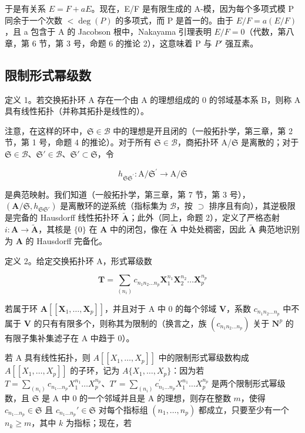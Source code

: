 于是有关系 \(E = F + aE\)。现在，E/F 是有限生成的 A-模，因为每个多项式模 P 同余于一个次数 \(<\deg(P)\) 的多项式，而 P 是首一的。由于 \(E/F = a(E/F)\)，且 a 包含于 A 的 Jacobson 根中，Nakayama 引理表明 \(E/F = 0\)（代数，第八章，第 6 节，第 3 号，命题 6 的推论 2），这意味着 P 与 \(P'\) 强互素。

\subsection{限制形式幂级数}

定义 1。若交换拓扑环 A 存在一个由 A 的理想组成的 0 的邻域基本系 B，则称 A 具有线性拓扑（并称其拓扑是线性的）。

注意，在这样的环中，\(\mathfrak{S} \in \mathcal{B}\) 中的理想是开且闭的（一般拓扑学，第三章，第 2 节，第 1 号，命题 4 的推论）。对于所有 \(\mathfrak{S} \in \mathcal{B}\)，商拓扑环 A/\(\mathfrak{S}\) 是离散的；对于 \(\mathfrak{S} \in \mathcal{B}\)、\(\mathfrak{S}' \in \mathcal{B}\)、\(\mathfrak{S}' \subset \mathfrak{S}\)，令

\[
h _ {\mathfrak {S S} ^ {\prime}} \colon \mathrm{A} / \mathfrak {S} ^ {\prime} \rightarrow \mathrm{A} / \mathfrak {S}
\]

是典范映射。我们知道（一般拓扑学，第三章，第 7 节，第 3 号），\((\mathbf{A} / \mathfrak{S}, h_{\mathfrak{S}\mathfrak{S}'})\) 是离散环的逆系统（指标集为 \(\mathcal{B}\)，按 \(\supset\) 排序且有向），其逆极限是完备的 Hausdorff 线性拓扑环 \(\tilde{\mathbf{A}}\)；此外（同上，命题 2），定义了严格态射 \(i: \mathbf{A} \to \tilde{\mathbf{A}}\)，其核是 \(\{0\}\) 在 \(\mathbf{A}\) 中的闭包，像在 \(\tilde{\mathbf{A}}\) 中处处稠密，因此 \(\tilde{\mathbf{A}}\) 典范地识别为 \(\mathbf{A}\) 的 Hausdorff 完备化。

定义 2。给定交换拓扑环 A，形式幂级数

\[
\mathbf {T} = \sum_ {(n _ {i})} c _ {n _ {1} n _ {2} \dots n _ {p}} \mathbf {X} _ {1} ^ {n _ {1}} \mathbf {X} _ {2} ^ {n _ {2}} \dots \mathbf {X} _ {p} ^ {n _ {p}}
\]

若属于环 \(\mathbf{A}[[\mathbf{X}_1,\ldots ,\mathbf{X}_p]]\)，并且对于 A 中 0 的每个邻域 \(\mathbf{V}\)，系数 \(c_{n_1n_2\dots n_p}\) 中不属于 \(\mathbf{V}\) 的只有有限多个，则称其为限制的（换言之，族 \((c_{n_1n_2\dots n_p})\) 关于 \(\mathbf{N}^p\) 的有限子集补集滤子在 A 中趋于 0）。

若 A 具有线性拓扑，则 \(A[[X_{1},\ldots,X_{p}]]\) 中的限制形式幂级数构成 \(A[[X_{1},\ldots,X_{p}]]\) 的子环，记为 \(A\{X_{1},\ldots,X_{p}\}\)：因为若 \(T=\sum_{(n_{i})}c_{n_{1}\ldots n_{p}}X_{1}^{n_{1}}\ldots X_{p}^{n_{p}}\)、\(T'=\sum_{(n_{i})}c_{n_{1}\ldots n_{p}}^{'}X_{1}^{n_{1}}\ldots X_{p}^{n_{p}}\) 是两个限制形式幂级数，且 \(\mathfrak{S}\) 是 A 中 0 的一个邻域并且是 A 的理想，则存在整数 \(m\)，使得 \(c_{n_1\ldots n_p} \in \mathfrak{S}\) 且 \(c_{n_1\ldots n_p}' \in \mathfrak{S}\) 对每个指标组 \((n_1, \ldots, n_p)\) 都成立，只要至少有一个 \(n_k \geqslant m\)，其中 \(k\) 为指标；现在，若


